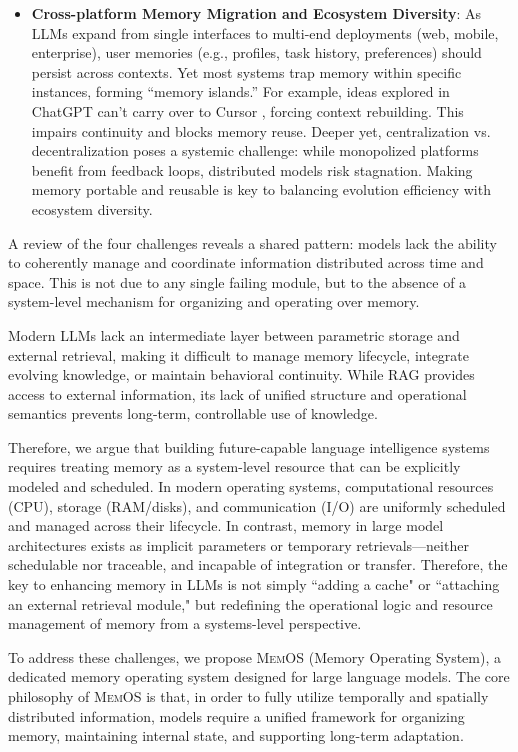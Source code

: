 \documentclass[]{memtensor}
\begin{document}
\begin{itemize}
    \item \textbf{Cross-platform Memory Migration and Ecosystem Diversity}: As LLMs expand from single interfaces to multi-end deployments (web, mobile, enterprise), user memories (e.g., profiles, task history, preferences) should persist across contexts. Yet most systems trap memory within specific instances, forming “memory islands.” For example, ideas explored in ChatGPT \cite{achiam_2023_gpt4} can't carry over to Cursor \cite{noauthor_cursor_nodate}, forcing context rebuilding. This impairs continuity and blocks memory reuse. Deeper yet, centralization vs. decentralization poses a systemic challenge: while monopolized platforms benefit from feedback loops, distributed models risk stagnation. Making memory portable and reusable is key to balancing evolution efficiency with ecosystem diversity.
    
\end{itemize}

A review of the four challenges reveals a shared pattern: models lack the ability to coherently manage and coordinate information distributed across time and space.
This is not due to any single failing module, but to the absence of a system-level mechanism for organizing and operating over memory.

Modern LLMs lack an intermediate layer between parametric storage and external retrieval, making it difficult to manage memory lifecycle, integrate evolving knowledge, or maintain behavioral continuity.
While RAG provides access to external information, its lack of unified structure and operational semantics prevents long-term, controllable use of knowledge.

Therefore, we argue that building future-capable language intelligence systems requires treating memory as a system-level resource that can be explicitly modeled and scheduled.
In modern operating systems, computational resources (CPU), storage (RAM/disks), and communication (I/O) are uniformly scheduled and managed across their lifecycle.
In contrast, memory in large model architectures exists as implicit parameters or temporary retrievals—neither schedulable nor traceable, and incapable of integration or transfer.
Therefore, the key to enhancing memory in LLMs is not simply ``adding a cache" or ``attaching an external retrieval module," but redefining the operational logic and resource management of memory from a systems-level perspective.

To address these challenges, we propose \textsc{MemOS} (Memory Operating System), a dedicated memory operating system designed for large language models.
The core philosophy of \textsc{MemOS} is that, in order to fully utilize temporally and spatially distributed information, models require a unified framework for organizing memory, maintaining internal state, and supporting long-term adaptation.
\end{document}

